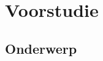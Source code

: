 
\section{Voorstudie} %
\label{sec:voorstudie}

\subsection{Onderwerp} %
\label{sub:onderwerp}

\lipsum[1]

